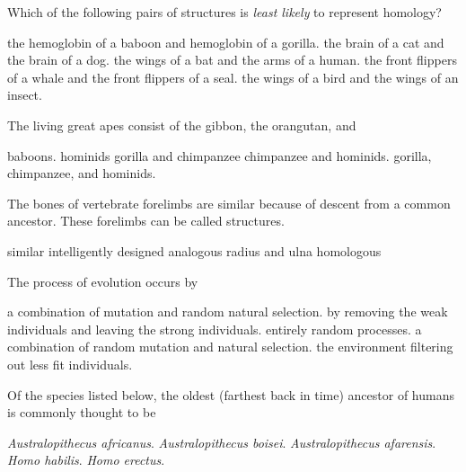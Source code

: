 

\question
Which of the following pairs of structures is \textit{least likely} to represent homology?

\begin{choices}
\choice the hemoglobin of a baboon and hemoglobin of a gorilla.
\choice the brain of a cat and the brain of a dog.
\choice the wings of a bat and the arms of a human.
\choice the front flippers of a whale and the front flippers of a seal.
\correctchoice the wings of a bird and the wings of an insect.
\end{choices}

\question
The living great apes consist of the gibbon, the orangutan, and

\begin{choices}
\choice baboons.
\choice hominids
\choice gorilla and chimpanzee
\choice chimpanzee and hominids.
\correctchoice gorilla, chimpanzee, and hominids.
\end{choices}

\question
The bones of vertebrate forelimbs are similar because of descent from a common ancestor. These forelimbs can be called \underline{\hspace{2cm}} structures.

\begin{choices}
\choice similar
\choice intelligently designed
\choice analogous
\choice radius and ulna
\correctchoice homologous
\end{choices}

\question
The process of evolution occurs by

\begin{choices}
\choice a combination of mutation and random natural selection.
\choice by removing the weak individuals and leaving the strong individuals.
\choice entirely random processes.
\correctchoice a combination of random mutation and natural selection.
\choice the environment filtering out less fit individuals.
\end{choices}

\question
Of the species listed below, the oldest (farthest back in time) ancestor of humans is commonly thought to be

\begin{choices}
\choice \textit{Australopithecus africanus}.
\choice \textit{Australopithecus boisei}.
\correctchoice \textit{Australopithecus afarensis}.
\choice \textit{Homo habilis}.
\choice \textit{Homo erectus}.
\end{choices}

